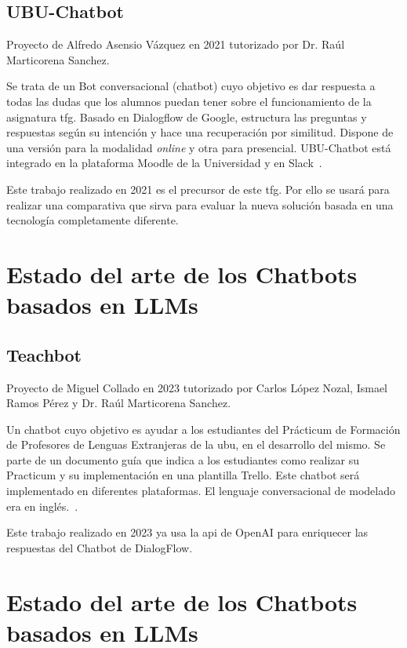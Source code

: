 \subsection{UBU-Chatbot}

Proyecto de Alfredo Asensio Vázquez en 2021 tutorizado por Dr. Raúl Marticorena Sanchez.

Se trata de un Bot conversacional (chatbot) cuyo objetivo es dar respuesta a todas las dudas que los alumnos puedan tener sobre el funcionamiento de la asignatura \acrlong{tfg}. Basado en Dialogflow de Google, estructura las preguntas y respuestas según su intención y hace una recuperación por similitud. Dispone de una versión para la modalidad \textit{online} y otra para presencial. UBU-Chatbot está integrado en la plataforma Moodle de la Universidad y en Slack~\cite{UBU-Chatbot}. 

Este trabajo realizado en 2021 es el precursor de este \acrshort{tfg}. Por ello se usará para realizar una comparativa que sirva para evaluar la nueva solución basada en una tecnología completamente diferente.

\section{Estado del arte de los Chatbots basados en LLMs}

\subsection{Teachbot}

Proyecto de Miguel Collado en 2023 tutorizado por Carlos López Nozal, Ismael Ramos Pérez y Dr. Raúl Marticorena Sanchez.

Un chatbot cuyo objetivo es ayudar a los estudiantes del Prácticum de Formación de Profesores de Lenguas Extranjeras de la \acrlong{ubu}, en el desarrollo del mismo. Se parte de un documento guía que indica a los estudiantes como realizar su Practicum y su implementación en una plantilla Trello. Este chatbot será implementado en diferentes plataformas. El lenguaje conversacional de modelado era en inglés.~\cite{Teachbot}. 

Este trabajo realizado en 2023 ya usa la \acrshort{api} de OpenAI para enriquecer las respuestas del Chatbot de DialogFlow.

\section{Estado del arte de los Chatbots basados en LLMs}


